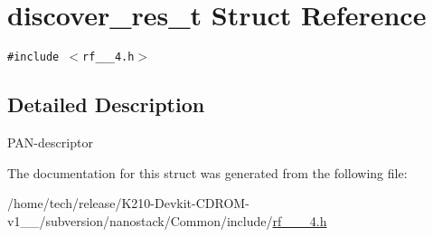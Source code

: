 \hypertarget{structdiscover__res__t}{
\section{discover\_\-res\_\-t Struct Reference}
\label{structdiscover__res__t}
}
{\tt \#include $<$rf\_\_\_\-4.h$>$}



\subsection{Detailed Description}
PAN-descriptor 



The documentation for this struct was generated from the following file:\begin{CompactItemize}
\item 
/home/tech/release/K210-Devkit-CDROM-v1\_\_/subversion/nanostack/Common/include/\hyperlink{rf__802__15__4_8h}{rf\_\_\_\-4.h}\end{CompactItemize}
